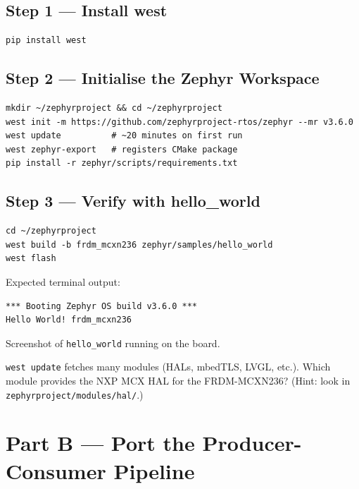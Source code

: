 \documentclass[11pt, a4paper]{article}
\begin{document}
\subsection{Step 1 --- Install west}

\begin{lstlisting}[style=bashstyle]
pip install west
\end{lstlisting}

\subsection{Step 2 --- Initialise the Zephyr Workspace}

\begin{lstlisting}[style=bashstyle]
mkdir ~/zephyrproject && cd ~/zephyrproject
west init -m https://github.com/zephyrproject-rtos/zephyr --mr v3.6.0
west update          # ~20 minutes on first run
west zephyr-export   # registers CMake package
pip install -r zephyr/scripts/requirements.txt
\end{lstlisting}

\subsection{Step 3 --- Verify with hello\_world}

\begin{lstlisting}[style=bashstyle]
cd ~/zephyrproject
west build -b frdm_mcxn236 zephyr/samples/hello_world
west flash
\end{lstlisting}

Expected terminal output:

\begin{lstlisting}[style=textstyle]
*** Booting Zephyr OS build v3.6.0 ***
Hello World! frdm_mcxn236
\end{lstlisting}

\begin{checkpointbox}[~A]
  Screenshot of \texttt{hello\_world} running on the board.
\end{checkpointbox}

\begin{questionbox}[~A1]
  \texttt{west update} fetches many modules (HALs, mbedTLS, LVGL, etc.). Which module
  provides the NXP MCX HAL for the FRDM-MCXN236? (Hint: look in
  \texttt{zephyrproject/modules/hal/}.)
\end{questionbox}

\section{Part B --- Port the Producer-Consumer Pipeline}
\end{document}
